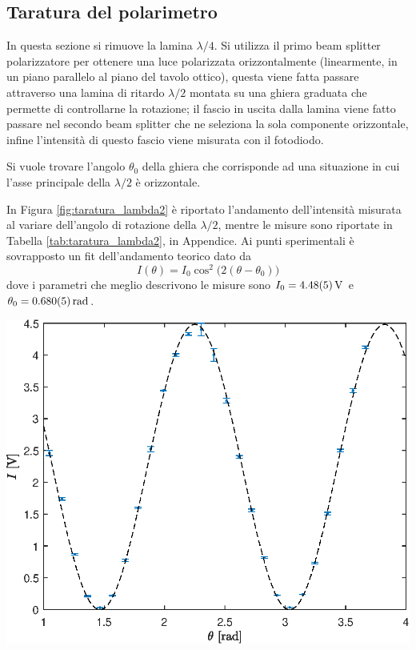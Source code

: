 \documentclass[10pt,oneside,a4paper]{article}
\newenvironment{Figure}
  {\par\medskip\noindent\minipage{\linewidth}}
  {\endminipage\par\medskip}
\begin{document}
\begin{multicols}{2}
\section{Taratura del polarimetro}\label{sec:taratura}
In questa sezione si rimuove la lamina $\lambda / 4$. Si utilizza il primo beam splitter polarizzatore per ottenere una luce polarizzata orizzontalmente (linearmente, in un piano parallelo al piano del tavolo ottico), questa viene fatta passare attraverso una lamina di ritardo $\lambda/2$ montata su una ghiera graduata che permette di controllarne la rotazione; il fascio in uscita dalla lamina viene fatto passare nel secondo beam splitter che ne seleziona la sola componente orizzontale, infine l'intensità di questo fascio viene misurata con il fotodiodo. 

Si vuole trovare l'angolo $\theta_0$ della ghiera che corrisponde ad una situazione in cui l'asse principale della $\lambda/2$ è orizzontale.

In Figura \ref{fig:taratura_lambda2} è riportato l'andamento dell'intensità misurata al variare dell'angolo di rotazione della $\lambda/2$, mentre le misure sono riportate in Tabella \ref{tab:taratura_lambda2}, in Appendice. Ai punti sperimentali è sovrapposto un fit dell'andamento teorico dato da
\begin{equation}
	I(\theta) = I_0 \cos^2\big( 2(\theta- \theta_0)\big)
\end{equation}
dove i parametri che meglio descrivono le misure sono $I_0 = \SI{4.48 \pm 0.05}{V}$ e ${\theta_0 = \SI{0.680\pm0.005}{rad}}$.
\begin{Figure}
	\begin{center}
	\includegraphics[width=0.9\linewidth]{taratura_lambda2.eps}
	\label{fig:taratura_lambda2}
	\end{center}
\end{Figure}


\end{multicols}
\end{document}
